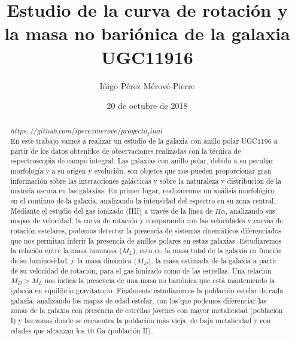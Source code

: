 \documentclass{article}
\newcommand{\hal}{$H\alpha$}
\begin{document}
\title{Estudio de la curva de rotación y la masa no bariónica de la galaxia UGC11916}
\author{Iñigo Pérez Mérové-Pierre}
\date{20 de octubre de 2018}
\maketitle

\begin{abstract}
\href{url}{$https://github.com/iperezmerove/proyecto_final$}\\En este trabajo vamos a realizar un estudio de la galaxia con anillo polar UGC1196 a partir de los datos obtenidos de observaciones realizadas con la técnica de espectroscopia de campo integral. Las galaxias con anillo polar, debido a su peculiar morfología y a su origen y evolución, son objetos que nos pueden proporcionar gran información sobre las interacciones galácticas y sobre la naturaleza y distribución de la materia oscura en las galaxias. En primer lugar, realizaremos un análisis morfológico en el continuo de la galaxia, analizando la intensidad del espectro en su zona central. Mediante el estudio del gas ionizado (HII) a través de la línea de \hal, analizando sus mapas de velocidad, la curva de rotación y comparando con las velocidades y curvas de rotación estelares, podemos detectar la presencia de sistemas cinemáticos diferenciados que nos permitan inferir la presencia de anillos polares en estas galaxias. Estudiaremos la relación entre la masa luminosa ($M_{L}$), esto es, la masa total de la galaxia en función de su luminosidad, y la masa dinámica ($M_{D}$), la masa estimada de la galaxia a partir de su velocidad de rotación, para el gas ionizado como de las estrellas. Una relación $M_{D} > M_{L}$ nos indica la presencia de una masa no bariónica que está manteniendo la galaxia en equilibrio gravitatorio. Finalmente estudiaremos la población estelar de cada galaxia, analizando los mapas de edad estelar, con los que podemos diferenciar las zonas de la galaxia con presencia de estrellas jóvenes con mayor metalicidad (población I) y las zonas donde se encuentra la población más vieja, de baja metalicidad y con edades que alcanzan los 10 Ga (población II). 
\end{abstract}
\end{document}
